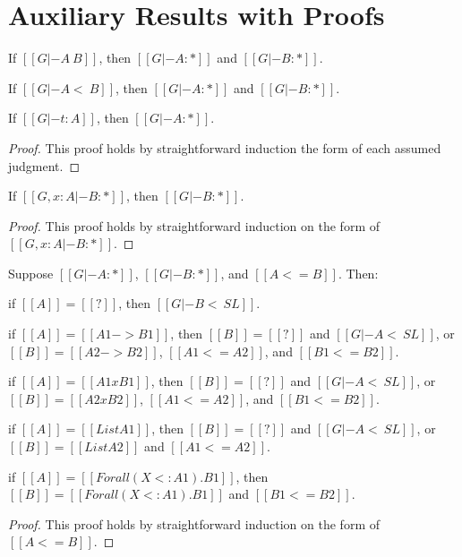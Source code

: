 \section{Auxiliary Results with Proofs}
\label{sec:auxiliary_results_with_proofs}
\begin{lemma}[Kinding]
  \label{lemma:kinding}
  \begin{enumR}
  \item If $[[G |- A ~ B]]$, then $[[G |- A : *]]$ and $[[G |- B : *]]$.
  \item If $[[G |- A <~ B]]$, then $[[G |- A : *]]$ and $[[G |- B : *]]$.
  \item If $[[G |- t : A]]$, then $[[G |- A : *]]$.
  \end{enumR}
\end{lemma}
\begin{proof}
  This proof holds by straightforward induction the form of each
  assumed judgment.
\end{proof}

\begin{lemma}
  \label{lemma:strengthening_for_kinding}
  If $[[G, x : A |- B : *]]$, then $[[G |- B : *]]$.
\end{lemma}
\begin{proof}
  This proof holds by straightforward induction on the form of $[[G, x : A |- B : *]]$.
\end{proof}

\begin{lemma}
  \label{lemma:inversion_of_type_precision}
  Suppose $[[G |- A : *]]$, $[[G |- B : *]]$, and $[[A <= B]]$.  Then:
  \begin{enumR}
  \item if $[[A]] = [[?]]$, then $[[G |- B <~ SL]]$.
  \item if $[[A]] = [[A1 -> B1]]$, then
    $[[B]] = [[?]]$ and $[[G |- A <~ SL]]$, or $[[B]] = [[A2 -> B2]]$, $[[A1 <= A2]]$, and $[[B1 <= B2]]$.
  \item if $[[A]] = [[A1 x B1]]$, then
    $[[B]] = [[?]]$ and $[[G |- A <~ SL]]$, or $[[B]] = [[A2 x B2]]$, $[[A1 <= A2]]$, and $[[B1 <= B2]]$.
  \item if $[[A]] = [[List A1]]$, then
    $[[B]] = [[?]]$ and $[[G |- A <~ SL]]$, or $[[B]] = [[List A2]]$ and $[[A1 <= A2]]$.
  \item if $[[A]] = [[Forall (X <: A1).B1]]$, then
    $[[B]] = [[Forall (X <: A1).B1]]$ and $[[B1 <= B2]]$.
  \end{enumR}
\end{lemma}
\begin{proof}
  This proof holds by straightforward induction on the form of $[[A <= B]]$.
\end{proof}

